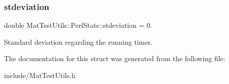 \subsubsection{\texorpdfstring{stdeviation}{stdeviation}}
{\footnotesize\ttfamily double Mat\+Test\+Utils\+::\+Perf\+Stats\+::stdeviation = 0.}

Standard deviation regarding the running times. 

The documentation for this struct was generated from the following file\+:\begin{DoxyCompactItemize}
\item 
include/Mat\+Test\+Utils.\+h\end{DoxyCompactItemize}
